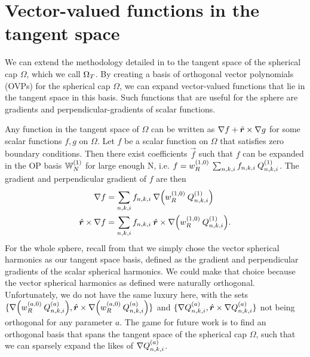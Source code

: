 

\section{Vector-valued functions in the tangent space}

We can extend the methodology detailed in  to the tangent space of the spherical cap $\Omega$, which we call ${\Omega_T}$. By creating a basis of orthogonal vector polynomials (OVPs) for the spherical cap $\Omega$, we can expand vector-valued functions that lie in the tangent space in this basis. Such functions that are useful for the sphere are gradients and perpendicular-gradients of scalar functions.

Any function in the tangent space of $\Omega$ can be written as $\nabla f + \hat{\bm{r}} \times \nabla g$ for some scalar functions $f, g$ on $\Omega$. Let $f$ be a scalar function on $\Omega$ that satisfies zero boundary conditions. Then there exist coefficients $\vec{f}$ such that $f$ can be expanded in the OP basis $\mathbb{W}_N^{(1)}$ for large enough N, i.e. $f = w_R^{(1,0)} \: \sum_{n,k,i} f_{n,k,i} \: Q_{n,k,i}^{(1)}$. The gradient and perpendicular gradient of $f$ are then
\begin{align*}
	\nabla f &= \sum_{n,k,i} f_{n,k,i} \: \nabla \Big( w_R^{(1,0)} \: Q_{n,k,i}^{(1)} \Big) \\
	\hat{\bm{r}} \times \nabla f &= \sum_{n,k,i} f_{n,k,i} \: \hat{\bm{r}} \times \nabla \Big( w_R^{(1,0)} \: Q_{n,k,i}^{(1)} \Big).
\end{align*}
For the whole sphere, recall from  that we simply chose the vector spherical harmonics as our tangent space basis, defined as the gradient and perpendicular gradients of the scalar spherical harmonics. We could make that choice because the vector spherical harmonics as defined were naturally orthogonal. Unfortunately, we do not have the same luxury here, with the sets $\{ \nabla \Big( w_R^{(a,0)} \: Q_{n,k,i}^{(a)} \Big), \hat{\bm{r}} \times \nabla \Big( w_R^{(a,0)} \: Q_{n,k,i}^{(a)} \Big) \}$ and $\{ \nabla Q_{n,k,i}^{(a)}, \hat{\bm{r}} \times \nabla Q_{n,k,i}^{(a)} \}$ not being orthogonal for any parameter $a$. The game for future work is to find an orthogonal basis that spans the tangent space of the spherical cap $\Omega$, such that we can sparsely expand the likes of $\nabla Q_{n,k,i}^{(a)}$.





